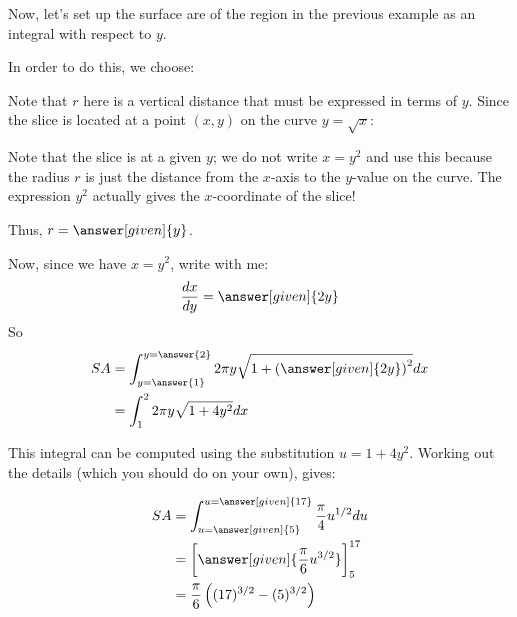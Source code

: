 \documentclass{ximera}
\begin{document}
\begin{example} Now, let's set up the surface are of the region in the previous example as an integral with respect to $y$. 

\begin{explanation}
 In order to do this, we choose:
    
    \begin{multipleChoice}
    \end{multipleChoice}
    
    Note that $r$ here is a vertical distance that must be expressed in terms of $y$.  Since the slice is located at a point $(x,y)$ on the curve $y=\sqrt{x}$:
    
    \begin{multipleChoice}
    \end{multipleChoice}
    
\begin{feedback}
Note that the slice is at a given $y$; we do not write $x=y^2$ and use this because the radius $r$ is just the distance from the $x$-axis to the $y$-value on the curve.  The expression $y^2$ actually gives the $x$-coordinate of the slice! 
\end{feedback}

    \begin{multipleChoice}
    \end{multipleChoice}

Thus, $r= \answer[given]{y}$.
     
Now, since we have $x=y^2$, write with me:
    \[
    \frac{dx}{dy} = \answer[given]{2y}
    \]
    So
    \begin{align*}
      SA &= \int_{y=\answer{1}}^{y=\answer{2}} 2\pi y \sqrt{1 + \left(\answer[given]{2y}\right)^2} dx\\
      &= \int_1^2 2\pi y \sqrt{1 +4y^2} dx\\
      \end{align*}
      
      This integral can be computed using the substitution $u=1+4y^2$.  Working out the details (which you should do on your own), gives:
      
      \begin{align*}
     SA &= \int_{u=\answer[given]{5}}^{u=\answer[given]{17}} \frac{\pi}{4} u^{1/2} du \\ 
     &= \bigg[\answer[given]{\frac{\pi}{6} u^{3/2}}\bigg]_5^{17}\\
     &= \frac{\pi}{6} \left((17)^{3/2}-(5)^{3/2}  \right)
    \end{align*}
  \end{explanation}
  \end{example}
  
\end{document}
